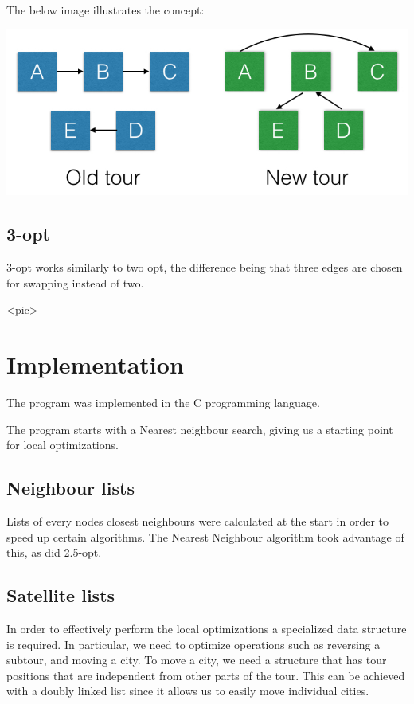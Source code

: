 \documentclass[paper=a4, fontsize=11pt,numbers=endperiod]{scrartcl} %
\numberwithin{equation}{section} %
\numberwithin{figure}{section} %
\numberwithin{table}{section} %
\begin{document}
The below image illustrates the concept:

\begin{center}
\includegraphics[scale=0.4]{25opt}
\end{center}

\subsection{3-opt}
3-opt works similarly to two opt, the difference being that three edges are chosen for swapping instead of two.

<pic>
    

\section{Implementation}
The program was implemented in the C programming language.

The program starts with a Nearest neighbour search, giving us a starting point for local optimizations.

\subsection{Neighbour lists}
Lists of every nodes closest neighbours were calculated at the start in order to speed up certain algorithms.
The Nearest Neighbour algorithm took advantage of this, as did 2.5-opt.

\subsection{Satellite lists}
In order to effectively perform the local optimizations a specialized data structure is required.
In particular, we need to optimize operations such as reversing a subtour, and moving a city.
To move a city, we need a structure that has tour positions that are independent from other parts of the tour.
This can be achieved with a doubly linked list since it allows us to easily move individual cities.
\end{document}
